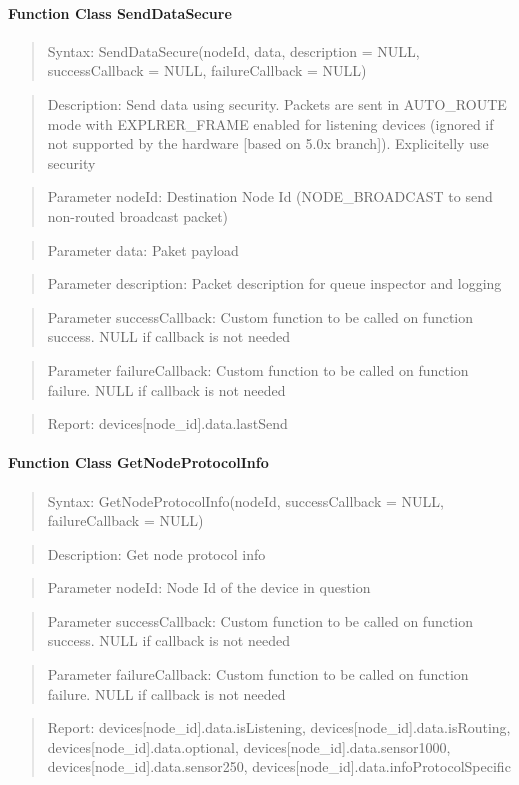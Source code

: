 \paragraph{Function Class SendDataSecure}
\begin{quote}Syntax: SendDataSecure(nodeId, data, description = NULL, successCallback = NULL, failureCallback = NULL)\end{quote}
\begin{quote}Description: Send data using security. Packets are sent in AUTO\_ROUTE mode with EXPLRER\_FRAME enabled for listening devices (ignored if not supported by the hardware [based on 5.0x branch]). Explicitelly use security\end{quote}
\begin{quote}Parameter nodeId: Destination Node Id (NODE\_BROADCAST to send non-routed broadcast packet)\end{quote}
\begin{quote}Parameter data: Paket payload\end{quote}
\begin{quote}Parameter description: Packet description for queue inspector and logging\end{quote}
\begin{quote}Parameter successCallback: Custom function to be called on function success. NULL if callback is not needed\end{quote}
\begin{quote}Parameter failureCallback: Custom function to be called on function failure. NULL if callback is not needed\end{quote}
\begin{quote}Report: devices[node\_id].data.lastSend\end{quote}

\paragraph{Function Class GetNodeProtocolInfo}
\begin{quote}Syntax: GetNodeProtocolInfo(nodeId, successCallback = NULL, failureCallback = NULL)\end{quote}
\begin{quote}Description: Get node protocol info\end{quote}
\begin{quote}Parameter nodeId: Node Id of the device in question\end{quote}
\begin{quote}Parameter successCallback: Custom function to be called on function success. NULL if callback is not needed\end{quote}
\begin{quote}Parameter failureCallback: Custom function to be called on function failure. NULL if callback is not needed\end{quote}
\begin{quote}Report: devices[node\_id].data.isListening, devices[node\_id].data.isRouting, devices[node\_id].data.optional, devices[node\_id].data.sensor1000, devices[node\_id].data.sensor250, devices[node\_id].data.infoProtocolSpecific\end{quote}

